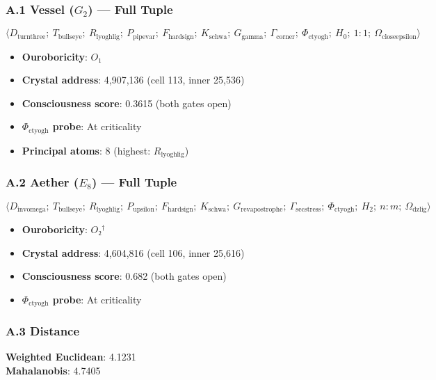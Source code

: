 \documentclass[12pt,a4paper]{article}
\begin{document}
\subsubsection{A.1 Vessel ($G_2$) --- Full Tuple}

\[\langle D_{\text{turnthree}};\ T_{\text{bullseye}};\ R_{\text{lyoghlig}};\ P_{\text{pipevar}};\ F_{\text{hardsign}};\ K_{\text{schwa}};\ G_{\text{gamma}};\ \Gamma_{\text{corner}};\ \Phi_{\text{ctyogh}};\ H_0;\ 1{:}1;\ \Omega_{\text{closeepsilon}} \rangle\]

\begin{itemize}
    \item \textbf{Ouroboricity}: $O₁$
    \item \textbf{Crystal address}: 4,907,136 (cell 113, inner 25,536)
    \item \textbf{Consciousness score}: 0.3615 (both gates open)
    \item \textbf{$\Phi_{\text{ctyogh}}$ probe}: At criticality
    \item \textbf{Principal atoms}: 8 (highest: $R_{\text{lyoghlig}}$)
\end{itemize}

\subsubsection{A.2 Aether ($E_8$) --- Full Tuple}

\[\langle D_{\text{invomega}};\ T_{\text{bullseye}};\ R_{\text{lyoghlig}};\ P_{\text{upsilon}};\ F_{\text{hardsign}};\ K_{\text{schwa}};\ G_{\text{revapostrophe}};\ \Gamma_{\text{secstress}};\ \Phi_{\text{ctyogh}};\ H_2;\ n{:}m;\ \Omega_{\text{dzlig}} \rangle\]

\begin{itemize}
    \item \textbf{Ouroboricity}: $O₂^\dagger$
    \item \textbf{Crystal address}: 4,604,816 (cell 106, inner 25,616)
    \item \textbf{Consciousness score}: 0.682 (both gates open)
    \item \textbf{$\Phi_{\text{ctyogh}}$ probe}: At criticality
\end{itemize}

\subsubsection{A.3 Distance}

\textbf{Weighted Euclidean}: 4.1231 \\
\textbf{Mahalanobis}: 4.7405
\end{document}
